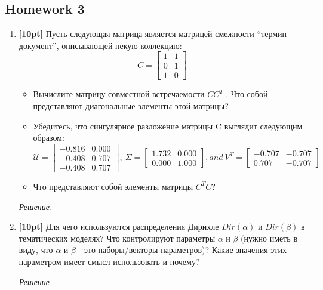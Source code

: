 \subsection*{Homework 3}

\begin{enumerate}
	\item \textbf{[10pt]} Пусть следующая матрица является матрицей смежности ``термин-документ'', 
	описывающей некую коллекцию:
	\begin{equation*}
	C = 
		\begin{bmatrix}
		1 & 1 \\
		0 & 1 \\
		1 & 0
		\end{bmatrix}
	\end{equation*}
	\begin{itemize}
		\item 	Вычислите матрицу совместной встречаемости $CC^T$ . Что собой представляют 
		диагональные элементы этой матрицы?
		\item Убедитесь, что сингулярное разложение матрицы C выглядит следующим образом:
		\begin{equation*}
			\mathcal{U} = 
			\begin{bmatrix}
			-0.816 & 0.000 \\
			-0.408 & 0.707 \\
			-0.408 & 0.707
			\end{bmatrix}, \
			\Sigma = 
			\begin{bmatrix}
			1.732 & 0.000 \\
			0.000 & 1.000
			\end{bmatrix}, and \
			V^T = 
			\begin{bmatrix}
			-0.707 & -0.707 \\
			0.707 & - 0.707
			\end{bmatrix}
		\end{equation*}
		\item Что представляют собой элементы матрицы $C^TC$?
	\end{itemize}
	\textit{Решение.} 
	
	\item \textbf{[10pt]} Для чего используются распределения Дирихле $Dir(\alpha)$ и $Dir(\beta)$ 
	в тематических моделях? Что контролируют параметры $\alpha$ и $\beta$ (нужно иметь в виду, что 
	$\alpha$ и $\beta$ - это наборы/векторы параметров)? Какие значения этих параметром имеет 
	смысл использовать и почему?
	
	\textit{Решение.}
	

\end{enumerate}
